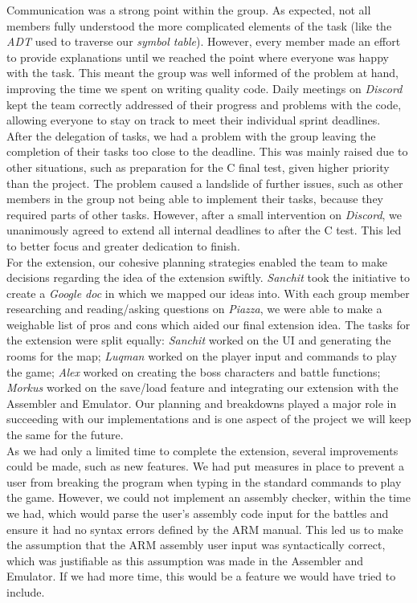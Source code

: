 \documentclass[10pt]{article}
\begin{document}
Communication was a strong point within the group. As expected, not all members fully understood the more complicated elements of the task (like the {\sl ADT} used to traverse our {\sl symbol table}). However, every member made an effort to provide explanations until we reached the point where everyone was happy with the task. This meant the group was well informed of the problem at hand, improving the time we spent on writing quality code. Daily meetings on {\sl Discord} kept the team correctly addressed of their progress and problems with the code, allowing everyone to stay on track to meet their individual sprint deadlines. 
\\

After the delegation of tasks, we had a problem with the group leaving the completion of their tasks too close to the deadline. This was mainly raised due to other situations, such as preparation for the C final test, given higher priority than the project. The problem caused a landslide of further issues, such as other members in the group not being able to implement their tasks, because they required parts of other tasks. However, after a small intervention on {\sl Discord}, we unanimously agreed to extend all internal deadlines to after the C test. This led to better focus and greater dedication to finish. 
\\

For the extension, our cohesive planning strategies enabled the team to make decisions regarding the idea of the extension swiftly. {\sl Sanchit} took the initiative to create a {\sl Google doc} in which we mapped our ideas into. With each group member researching and reading/asking questions on {\sl Piazza}, we were able to make a weighable list of pros and cons which aided our final extension idea. The tasks for the extension were split equally: {\sl Sanchit} worked on the UI and generating the rooms for the map; {\sl Luqman} worked on the player input and commands to play the game; {\sl Alex} worked on creating the boss characters and battle functions; {\sl Morkus} worked on the save/load feature and integrating our extension with the Assembler and Emulator. Our planning and breakdowns played a major role in succeeding with our implementations and is one aspect of the project we will keep the same for the future. 
\\

As we had only a limited time to complete the extension, several improvements could be made, such as new features. We had put measures in place to prevent a user from breaking the program when typing in the standard commands to play the game. However, we could not implement an assembly checker, within the time we had, which would parse the user’s assembly code input for the battles and ensure it had no syntax errors defined by the ARM manual. This led us to make the assumption that the ARM assembly user input was syntactically correct, which was justifiable as this assumption was made in the Assembler and Emulator. If we had more time, this would be a feature we would have tried to include. 
\\
\end{document}
